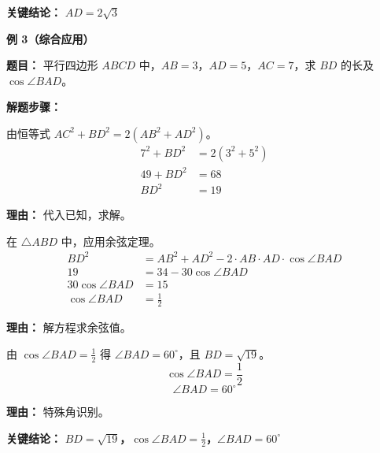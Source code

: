 \begin{examplebox}
	\textbf{\textcolor{CExample}{关键结论：}}
	\textbf{$AD = 2\sqrt{3}$}

	\medskip
	\textbf{\textcolor{CExample}{例 3（综合应用）}}

	\textbf{\textcolor{CExample}{题目：}}
	平行四边形 $ABCD$ 中，$AB=3$，$AD=5$，$AC=7$，求 $BD$ 的长及 $\cos\angle BAD$。

	\textbf{\textcolor{CExample}{解题步骤：}}
	\begin{description}[style=nextline, leftmargin=2.8em, labelsep=0.5em, itemsep=0.45em]
		\item[\textbf{第一步（求 $BD$ 平方）：}] 由恒等式 $AC^2+BD^2 = 2(AB^2+AD^2)$。
			\[
				\begin{aligned}
					7^2+BD^2 &= 2(3^2+5^2)\\
					49+BD^2 &= 68\\
					BD^2 &= 19
			\end{aligned}
			\]
			\par\textbf{理由：} 代入已知，求解。
		\item[\textbf{第二步（余弦定理）：}] 在 $\triangle ABD$ 中，应用余弦定理。
			\[
				\begin{aligned}
					BD^2 &= AB^2+AD^2 - 2\cdot AB\cdot AD\cdot\cos\angle BAD\\
					19 &= 34 - 30\cos\angle BAD\\
					30\cos\angle BAD &= 15\\
					\cos\angle BAD &= \frac12
			\end{aligned}
			\]
			\par\textbf{理由：} 解方程求余弦值。
		\item[\textbf{第三步（结果）：}] 由 $\cos\angle BAD = \frac12$ 得 $\angle BAD = 60^\circ$，且 $BD=\sqrt{19}$。
			\[
				\cos\angle BAD = \frac12
			\]
			\[
				\angle BAD = 60^\circ
			\]
			\par\textbf{理由：} 特殊角识别。
	\end{description}

	\textbf{\textcolor{CExample}{关键结论：}}
	\textbf{$BD=\sqrt{19}$，$\cos\angle BAD = \frac12$，$\angle BAD=60^\circ$}
\end{examplebox}
